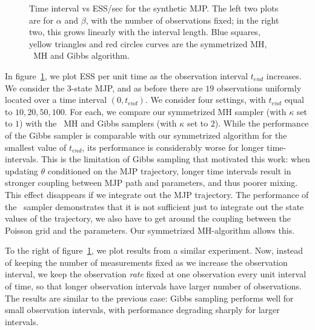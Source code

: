 \begin{figure}[H]
\begin{minipage}[hp]{0.24\linewidth}
  \end{minipage}
  \caption{Time interval vs ESS/sec for the synthetic MJP. The left two plots are for $\alpha$ and $\beta$, with the number of observations fixed; in the right two, this grows linearly with the interval length. {Blue squares, yellow triangles and red circles curves} are the symmetrized MH, \naive\ MH and Gibbs algorithm.
  }
     \label{fig:TSS}
  \end{figure}
In figure~\ref{fig:TSS}, we plot ESS per unit time as the observation interval $t_{end}$ increases. 
We consider the 3-state MJP, and as before there are $19$ observations uniformly located over a time interval $(0,t_{end})$.
We consider four settings, with $t_{end}$ equal to $10, 20, 50, 100$. 
For each, we compare our symmetrized MH sampler (with $\kappa$ set to $1$) with the \naive\ MH and Gibbs samplers (with $\kappa$ set to $2$). 
While the performance of the Gibbs sampler is comparable with our symmetrized algorithm for the smallest value of $t_{end}$, its performance is considerably worse for longer time-intervals.  
This is the limitation of Gibbs sampling that motivated this work: when updating $\theta$ conditioned on the MJP trajectory, longer time intervals result in stronger coupling between MJP path and parameters, and thus poorer mixing. 
This effect disappears if we integrate out the MJP trajectory. 
The performance of the \naive\ sampler demonstrates that it is not sufficient just to integrate out the state values of the trajectory, we also have to get around the coupling between the Poisson grid and the parameters. 
Our symmetrized MH-algorithm allows this. 


To the right of figure~\ref{fig:TSS}, we plot results from a similar experiment. 
Now, instead of keeping the number of measurements fixed as we increase the observation interval, we keep the observation {\em rate} fixed at one observation every unit interval of time, so that longer observation intervals have larger number of observations. 
The results are similar to the previous case: Gibbs sampling performs well for small observation intervals, with performance degrading sharply for larger intervals. 

